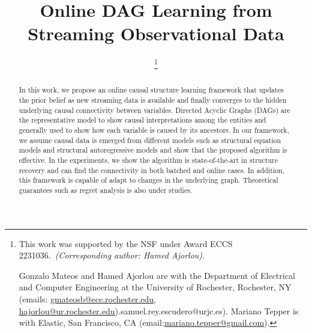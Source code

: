 \documentclass[journal,twoside]{IEEEtran}
\begin{document}
\title{Online DAG Learning from Streaming Observational Data}

\author{
\thanks{This work was supported by the NSF under Award ECCS 2231036.~\emph{(Corresponding author: Hamed Ajorlou)}.

Gonzalo Mateos and Hamed Ajorlou are with the Department of Electrical and Computer Engineering at the
University of Rochester, Rochester, NY (emails: \href{gmateosb@ece.rochester.edu}{gmateosb@ece.rochester.edu}, \href{hajorlou@ur.rochester.edu}{hajorlou@ur.rochester.edu}).{samuel.rey.escudero@urjc.es}). Mariano Tepper is with Elastic, San Francisco, CA (email:\href{mariano.tepper@gmail.com}{mariano.tepper@gmail.com}).
}}




\maketitle

%
%

\begin{abstract}
In this work, we propose an online causal structure learning framework that updates the prior belief as new streaming data is available and finally converges to the hidden underlying causal connectivity between variables. Directed Acyclic Graphs (DAGs) are the representative model to show causal interpretations among the entities and generally used to show how each variable is caused by its ancestors. In our framework, we assume causal data is emerged from different models such as structural equation models and structural autoregressive models and show that the proposed algorithm is effective. In the experiments, we show the algorithm is state-of-the-art in structure recovery and can find the connectivity in both batched and online cases. In addition, this framework is capable of adapt to changes in the underlying graph. Theoretical guarantees such as regret analysis is also under studies.
\end{abstract}
\end{document}
